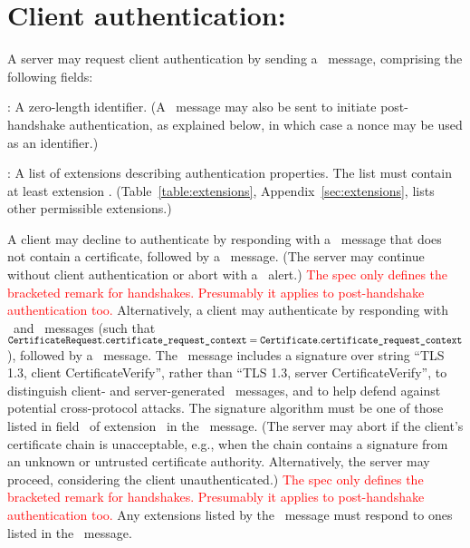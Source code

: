 \section{Client authentication: \CertificateRequest}\label{sec:CR}

A server may request client authentication by sending a \CertificateRequest\ 
message, comprising the following fields:

\begin{description}

\item \TLScertificateRequestContext: A zero-length identifier. (A 
  \CertificateRequest\ message may also be sent to initiate post-handshake 
  authentication, as explained below, in which case a nonce may be used as
  an identifier.)

\item \TLSextensions: A list of extensions describing authentication
  properties. The list must contain at least extension \TLSsignatureAlgorithms.
  (Table~\ref{table:extensions}, Appendix~\ref{sec:extensions}, lists other
  permissible extensions.)

    
\end{description}

\begin{sloppypar}
\noindent
A client %
may decline to authenticate by responding with a \Certificate\ message
that does not contain a certificate, followed by a \Finished\ message. 
(The server may continue %
without client authentication or abort with a \TLScertificateRequired\ alert.)
\ifSpecNotes
\textcolor{red}{
  The spec only defines the bracketed remark for handshakes. Presumably 
  it applies to post-handshake authentication too.
}
\fi
 Alternatively,
a client may authenticate by responding with \Certificate\ 
and \CertificateVerify\ messages 
(such that $\texttt{CertificateRequest}.\texttt{certificate\_request\_context} = \texttt{Certificate}.\texttt{certificate\_request\_context}$),
followed by a \Finished\ message.
The \CertificateVerify\ message includes a signature over string ``TLS 1.3, client CertificateVerify'',
rather than ``TLS 1.3, server CertificateVerify'', to distinguish client-
and server-generated \CertificateVerify\ messages, and to help defend 
against potential cross-protocol attacks. The signature
algorithm must be one of those listed in field
\TLSsupportedSignatureAlgorithms\ of extension \TLSsignatureAlgorithms\
in the \CertificateRequest\ message.
(The server may abort %
if the client's certificate chain is 
unacceptable, e.g., when the chain contains a signature from an unknown or 
untrusted certificate authority. Alternatively, the server may proceed, 
considering the client unauthenticated.)
\ifSpecNotes
\textcolor{red}{
  The spec only defines the bracketed remark for handshakes. Presumably 
  it applies to post-handshake authentication too.
}
\fi
Any extensions listed by the \Certificate\ message must respond to ones 
listed in the \CertificateRequest\ message.
\end{sloppypar}

